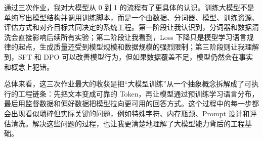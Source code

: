 \documentclass[a4paper,12pt]{ctexart}
\begin{document}
通过三次作业，我对大模型从 0 到 1 的流程有了更具体的认识。训练大模型不是单纯写出模型结构并调用训练脚本，而是一个由数据、分词器、模型、训练资源、评估方式和对齐目标共同决定的系统工程。第一阶段让我认识到，分词器和数据清洗会直接影响后续所有实验；第二阶段让我看到，Loss 下降只是模型学习语言规律的起点，生成质量还受到模型规模和数据规模的强烈限制；第三阶段则让我理解到，SFT 和 DPO 可以改善模型行为，但如果数据覆盖不足，模型仍然会在事实和概念上犯错。

总体来看，这三次作业最大的收获是把“大模型训练”从一个抽象概念拆解成了可执行的工程链条：先把文本变成可靠的 Token，再让模型通过预训练学习语言分布，最后用监督数据和偏好数据把模型拉向更可用的回答方式。这个过程中的每一步都会出现看似琐碎但实际关键的问题，例如特殊字符、内存瓶颈、Prompt 设计和评估清洗。解决这些问题的过程，也让我更清楚地理解了大模型能力背后的工程基础。
\end{document}
